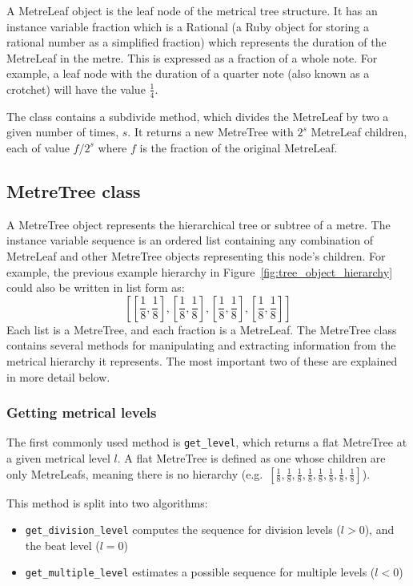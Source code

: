 \documentclass[12pt,twoside,openright]{report}
\begin{document}
A MetreLeaf object is the leaf node of the metrical tree structure. It has an
instance variable fraction which is a Rational (a Ruby object for storing a
rational number as a simplified fraction) which represents the duration of the
MetreLeaf in the metre. This is expressed as a fraction of a whole note. For
example, a leaf node with the duration of a quarter note (also known as a
crotchet) will have the value $\frac{1}{4}$.

The class contains a subdivide method, which divides the MetreLeaf by two a
given number of times, $s$. It returns a new MetreTree with $2^s$ MetreLeaf children, each of value $f/2^s$ where $f$ is the fraction of the original MetreLeaf.


\subsection{MetreTree class} \label{metretree}

A MetreTree object represents the hierarchical tree or subtree of a metre. The
instance variable sequence is an ordered list containing any combination of
MetreLeaf and other MetreTree objects representing this node's children. For
example, the previous example hierarchy in Figure~\ref{fig:tree_object_hierarchy} could also be written in list form as:
\[\left[\left[\frac{1}{8},\frac{1}{8}\right],\left[\frac{1}{8},\frac{1}{8}\right],\left[\frac{1}{8},\frac{1}{8}\right],\left[\frac{1}{8},\frac{1}{8}\right]\right]\]
Each list is a
MetreTree, and each fraction is a MetreLeaf. The MetreTree class contains
several methods for manipulating and extracting information from the metrical
hierarchy it represents. The most important two of these are explained in more
detail below.

\subsubsection{Getting metrical levels} \label{get_level}

The first commonly used method is \verb'get_level', which returns a flat MetreTree at
a given metrical level $l$. A flat MetreTree is defined as one whose children are
only MetreLeafs, meaning there is no hierarchy (e.g.\ $\left[\frac{1}{8},\frac{1}{8},\frac{1}{8},\frac{1}{8},\frac{1}{8},\frac{1}{8},\frac{1}{8},\frac{1}{8}\right]$).

This method is split into two algorithms:
\begin{itemize}
    \item \verb'get_division_level' computes the sequence for division levels ($l>0$), and the beat level ($l=0$)
	\item \verb'get_multiple_level' estimates a possible sequence for multiple levels ($l<0$)
\end{itemize}
\end{document}
